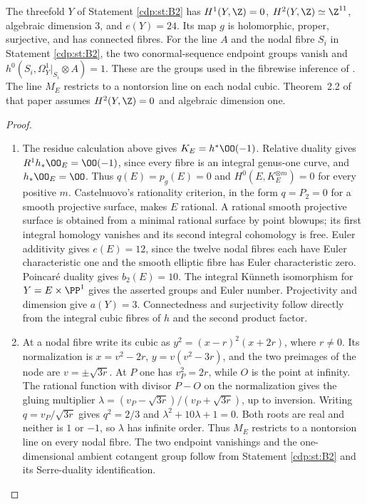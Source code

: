 \begin{proposition}\hypertarget{tag-01BM}{}\label{cdp:st:B3}

The threefold $Y$ of Statement \ref{cdp:st:B2} has $H^1(Y,\Z)=0$, $H^2(Y,\Z)\simeq\Z^{11}$, algebraic dimension $3$, and $e(Y)=24$. Its map $g$ is holomorphic, proper, surjective, and has connected fibres. For the line $A$ and the nodal fibre $S_i$ in Statement \ref{cdp:st:B2}, the two conormal-sequence endpoint groups vanish and $h^0(S_i,\Omega_Y^1|_{S_i}\otimes A)=1$. These are the groups used in the fibrewise inference of \cite[Section~7]{CDP20}. The line $M_E$ restricts to a nontorsion line on each nodal cubic. Theorem~2.2 of that paper assumes $H^2(Y,\Z)=0$ and algebraic dimension one.
\end{proposition}


\begin{proof}
\begin{enumerate}[label={$\langle1\rangle$\arabic*.},leftmargin=*]
\item 
The residue calculation above gives $K_E=h^*\OO(-1)$. Relative duality gives $R^1h_*\OO_E=\OO(-1)$, since every fibre is an integral genus-one curve, and $h_*\OO_E=\OO$. Thus $q(E)=p_g(E)=0$ and $H^0(E,K_E^{\otimes m})=0$ for every positive $m$. Castelnuovo's rationality criterion, in the form $q=P_2=0$ for a smooth projective surface, makes $E$ rational. A rational smooth projective surface is obtained from a minimal rational surface by point blowups; its first integral homology vanishes and its second integral cohomology is free. Euler additivity gives $e(E)=12$, since the twelve nodal fibres each have Euler characteristic one and the smooth elliptic fibre has Euler characteristic zero. Poincar\'e duality gives $b_2(E)=10$. The integral K\"unneth isomorphism for $Y=E\times\PP^1$ gives the asserted groups and Euler number. Projectivity and dimension give $a(Y)=3$. Connectedness and surjectivity follow directly from the integral cubic fibres of $h$ and the second product factor.

\item At a nodal fibre write its cubic as $y^2=(x-r)^2(x+2r)$, where $r\ne0$. Its normalization is $x=v^2-2r$, $y=v(v^2-3r)$, and the two preimages of the node are $v=\pm\sqrt{3r}$. At $P$ one has $v_P^2=2r$, while $O$ is the point at infinity. The rational function with divisor $P-O$ on the normalization gives the gluing multiplier $\lambda=(v_P-\sqrt{3r})/(v_P+\sqrt{3r})$, up to inversion. Writing $q=v_P/\sqrt{3r}$ gives $q^2=2/3$ and $\lambda^2+10\lambda+1=0$. Both roots are real and neither is $1$ or $-1$, so $\lambda$ has infinite order. Thus $M_E$ restricts to a nontorsion line on every nodal fibre. The two endpoint vanishings and the one-dimensional ambient cotangent group follow from Statement \ref{cdp:st:B2} and its Serre-duality identification.

\end{enumerate}
\end{proof}